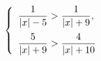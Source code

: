 \begin{ex}[type=ineq_system]
	\begin{condition}
		\( \left\{
		\begin{array}{l}
			\dfrac{1}{|x|-5}>\dfrac{1}{|x|+9},\vspace{2mm}\\
			\dfrac{5}{|x|+9}>\dfrac{4}{|x|+10}
		\end{array}
		\right. \)
	\end{condition}
\end{ex}